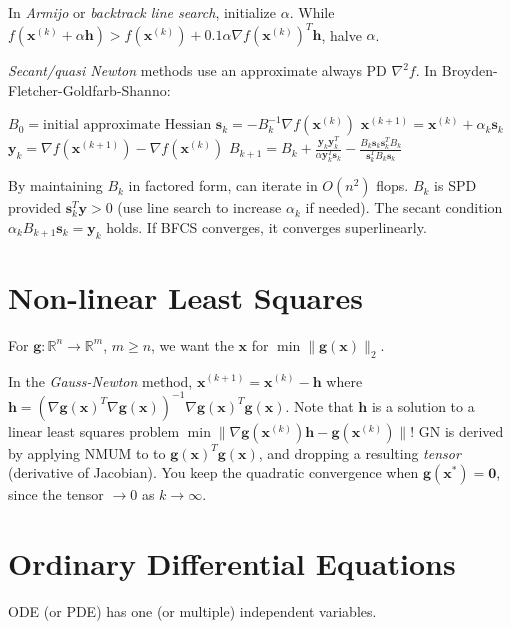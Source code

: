 \documentclass[landscape,10pt,letterpaper]{article}
\newcommand{\heading}[1]{\vspace{-1.5em} \section*{#1} \vspace{-1.0em}}
\begin{document}
\begin{multicols}{4}
In \emph{Armijo} or \emph{backtrack line search}, initialize $\alpha$.  While $f(\mathbf{x}^{(k)} + \alpha \mathbf{h}) > f(\mathbf{x}^{(k)}) + 0.1 \alpha \nabla f(\mathbf{x}^{(k)})^T \mathbf{h}$, halve $\alpha$.

\emph{Secant/quasi Newton} methods use an approximate always PD $\nabla^2 f$.  In Broyden-Fletcher-Goldfarb-Shanno:

\begin{algorithmic}[1]
\STATE $B_0 = \mbox{initial approximate Hessian}$ 
	\STATE $\mathbf{s}_k = - B_k^{-1} \nabla f(\mathbf{x}^{(k)})$
	\STATE $\mathbf{x}^{(k+1)} = \mathbf{x}^{(k)} + \alpha_k \mathbf{s}_k$ 
	\STATE $\mathbf{y}_k = \nabla f(\mathbf{x}^{(k+1)}) - \nabla f(\mathbf{x}^{(k)})$
	\STATE $B_{k+1} = B_k + \displaystyle \frac{\mathbf{y}_k \mathbf{y}_k^T}{\alpha \mathbf{y}_k^T \mathbf{s}_k} - \frac{B_k \mathbf{s}_k \mathbf{s}_k^T B_k}{\mathbf{s}_k^T B_k \mathbf{s}_k}$ \label{alg:bfcs-bupdate}
\ENDFOR
\end{algorithmic}
By maintaining $B_k$ in factored form, can iterate in $O(n^2)$ flops.  $B_k$ is SPD provided $\mathbf{s}_k^T \mathbf{y} > 0$ (use line search to increase $\alpha_k$ if needed).  The secant condition $\alpha_k B_{k+1} \mathbf{s}_k = \mathbf{y}_k$ holds.  If BFCS converges, it converges superlinearly.

\heading{Non-linear Least Squares}

For $\mathbf{g} : \mathbb{R}^n \to \mathbb{R}^m$, $m \geq n$, we want the $\mathbf{x}$ for $\min \| \mathbf{g}(\mathbf{x}) \|_2$.

In the \emph{Gauss-Newton} method, $\mathbf{x}^{(k+1)} = \mathbf{x}^{(k)} - \mathbf{h}$ where $\mathbf{h} = ( \nabla \mathbf{g}(\mathbf{x})^T \nabla \mathbf{g}(\mathbf{x}) )^{-1} \nabla \mathbf{g}(\mathbf{x})^T \mathbf{g}(\mathbf{x})$.  Note that $\mathbf{h}$ is a solution to a linear least squares problem $\min \| \nabla \mathbf{g}(\mathbf{x}^{(k)}) \mathbf{h} - \mathbf{g}(\mathbf{x}^{(k)}) \|$!  GN is derived by applying NMUM to to $\mathbf{g}(\mathbf{x})^T \mathbf{g}(\mathbf{x})$, and dropping a resulting \emph{tensor} (derivative of Jacobian).  You keep the quadratic convergence when $\mathbf{g}(\mathbf{x}^*) = \mathbf{0}$, since the tensor $\to 0$ as $k \to \infty$.

\heading{Ordinary Differential Equations}

ODE (or PDE) has one (or multiple) independent variables.


\end{multicols}
\end{document}
